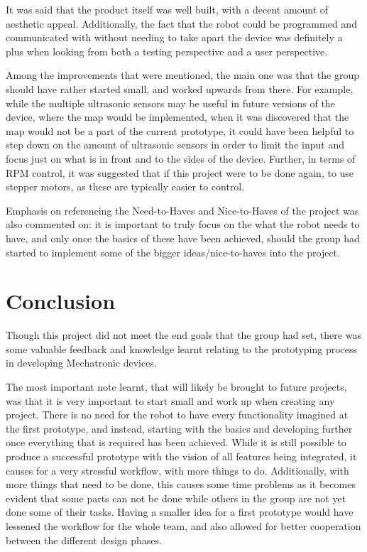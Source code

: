 \documentclass[11pt]{article}
\begin{document}
It was said that the product itself was well built, with a decent amount of aesthetic appeal. Additionally, the fact that the robot could be programmed and communicated with without needing to take apart the device was definitely a plus when looking from both a testing perspective and a user perspective. 

Among the improvements that were mentioned, the main one was that the group should have rather started small, and worked upwards from there. For example, while the multiple ultrasonic sensors may be useful in future versions of the device, where the map would be implemented, when it was discovered that the map would not be a part of the current prototype, it could have been helpful to step down on the amount of ultrasonic sensors in order to limit the input and focus just on what is in front and to the sides of the device. Further, in terms of RPM control, it was suggested that if this project were to be done again, to use stepper motors, as these are typically easier to control.

Emphasis on referencing the Need-to-Haves and Nice-to-Haves of the project was also commented on: it is important to truly focus on the what the robot needs to have, and only once the basics of these have been achieved, should the group had started to implement some of the bigger ideas/nice-to-haves into the project.
\newpage
\section{Conclusion}
Though this project did not meet the end goals that the group had set, there was some valuable feedback and knowledge learnt relating to the prototyping process in developing Mechatronic devices.

The most important note learnt, that will likely be brought to future projects, was that it is very important to start small and work up when creating any project. There is no need for the robot to have every functionality imagined at the first prototype, and instead, starting with the basics and developing further once everything that is required has been achieved. While it is still possible to produce a successful prototype with the vision of all features being integrated, it causes for a very stressful workflow, with more things to do. Additionally, with more things that need to be done, this causes some time problems as it becomes evident that some parts can not be done while others in the group are not yet done some of their tasks. Having a smaller idea for a first prototype would have lessened the workflow for the whole team, and also allowed for better cooperation between the different design phases.
\end{document}
